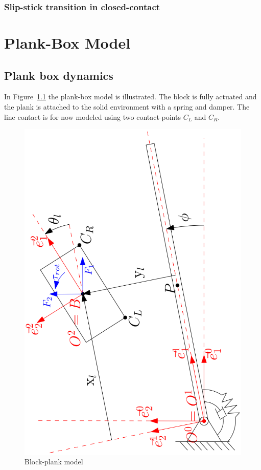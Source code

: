 \documentclass[DC2017114Bouma.tex]{subfiles}
\begin{document}
\subsection{Slip-stick transition in closed-contact}


\cleartooddpage
\chapter{Plank-Box Model} 
\section{Plank box dynamics}
In Figure~\ref{fig:blockplank} the plank-box model is illustrated. The block is fully actuated and the plank is attached to the solid environment with a spring and damper. The line contact is for now modeled using two contact-points $C_L$ and $C_R$.

\begin{figure}[h]
\centering
\includegraphics[width=.6\textwidth,angle=-90]{blockplankmodel.PNG}\caption{Block-plank model}\label{fig:blockplank}
\end{figure}
\end{document}
